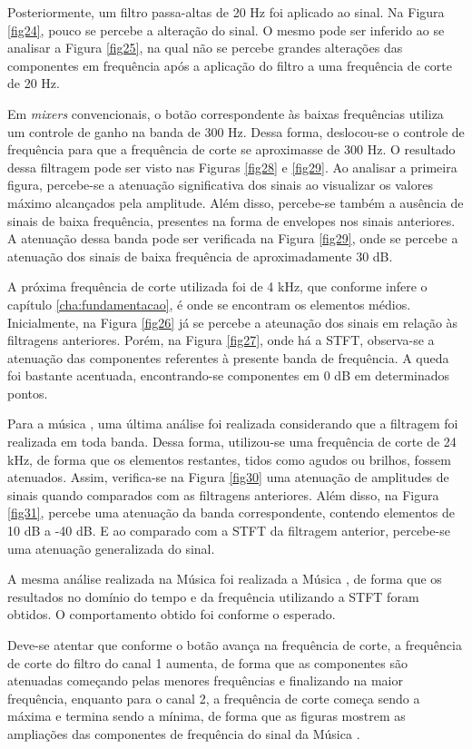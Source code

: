 Posteriormente, um filtro passa-altas de 20 Hz foi aplicado ao sinal. Na Figura \ref{fig24}, pouco se percebe a alteração do sinal. O mesmo pode ser inferido ao se analisar a Figura \ref{fig25}, na qual não se percebe grandes alterações das componentes em frequência após a aplicação do filtro a uma frequência de corte de 20 Hz.

Em \textit{mixers} convencionais, o botão correspondente às baixas frequências utiliza um controle de ganho na banda de 300 Hz. Dessa forma, deslocou-se o controle de frequência para que a frequência de corte se aproximasse de 300 Hz. O resultado dessa filtragem pode ser visto nas Figuras \ref{fig28} e \ref{fig29}. Ao analisar a primeira figura, percebe-se a atenuação significativa dos sinais ao visualizar os valores máximo alcançados pela amplitude. Além disso, percebe-se também a ausência de sinais de baixa frequência, presentes na forma de envelopes nos sinais anteriores. A atenuação dessa banda pode ser verificada na Figura \ref{fig29}, onde se percebe a atenuação dos sinais de baixa frequência de aproximadamente 30 dB.

A próxima frequência de corte utilizada foi de 4 kHz, que conforme infere o capítulo \ref{cha:fundamentacao}, é onde se encontram os elementos médios. Inicialmente, na Figura \ref{fig26} já se percebe a ateunação dos sinais em relação às filtragens anteriores. Porém, na Figura \ref{fig27}, onde há a STFT, observa-se a atenuação das componentes referentes à presente banda de frequência. A queda foi bastante acentuada, encontrando-se componentes em 0 dB em determinados pontos.

Para a música \cite{track01}, uma última análise foi realizada considerando que a filtragem foi realizada em toda banda. Dessa forma, utilizou-se uma frequência de corte de 24 kHz, de forma que os elementos restantes, tidos como agudos ou brilhos, fossem atenuados. Assim, verifica-se na Figura \ref{fig30} uma atenuação de amplitudes de sinais quando comparados com as filtragens anteriores. Além disso, na Figura \ref{fig31}, percebe uma atenuação da banda correspondente, contendo elementos de 10 dB a -40 dB. E ao comparado com a STFT da filtragem anterior, percebe-se uma atenuação generalizada do sinal. 

A mesma análise realizada na Música \cite{track01} foi realizada a Música \cite{track02}, de forma que os resultados no domínio do tempo e da frequência utilizando a STFT foram obtidos. O comportamento obtido foi conforme o esperado.

Deve-se atentar que conforme o botão avança na frequência de corte, a frequência de corte do filtro do canal 1 aumenta, de forma que as componentes são atenuadas começando pelas menores frequências e finalizando na maior frequência, enquanto para o canal 2, a frequência de corte começa sendo a máxima e termina sendo a mínima, de forma que as figuras mostrem as ampliações das componentes de frequência do sinal da Música \cite{track02}.

